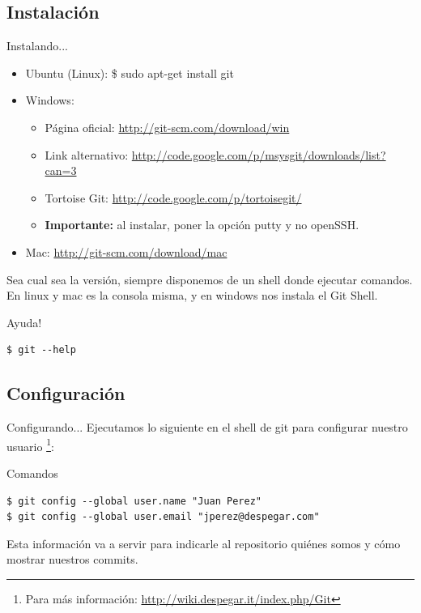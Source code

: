 \documentclass{beamer}
\begin{document}
\subsection{Instalación}
\begin{frame}[fragile]{Instalando...} 
  \begin{block}{}
      \begin{itemize}
      \item Ubuntu (Linux): \$ sudo apt-get install git \pause
	\item	 Windows: \begin{itemize}
			\item Página oficial: \url{http://git-scm.com/download/win} 
			\item Link alternativo: \url{http://code.google.com/p/msysgit/downloads/list?can=3}
			\item Tortoise Git: \url{http://code.google.com/p/tortoisegit/}
			\item \textbf{Importante:} al instalar, poner la opción putty y no openSSH.
		      \end{itemize} \pause
      \item Mac: \url{http://git-scm.com/download/mac} \pause
      \end{itemize}
  
    Sea cual sea la versión, siempre disponemos de un shell donde ejecutar comandos. En linux y mac es la consola misma,
    y en windows nos instala el Git Shell.
  \end{block}
  \pause
  \begin{block}{Ayuda!}
    \begin{verbatim}
$ git --help
     \end{verbatim}
  \end{block}
  
\end{frame}
\subsection{Configuración}
\begin{frame}[fragile]{Configurando...}
  Ejecutamos lo siguiente en el shell de git para configurar nuestro usuario \footnote{Para más información: \url{http://wiki.despegar.it/index.php/Git}}:
  
  \begin{block}{Comandos}
  \begin{verbatim}
$ git config --global user.name "Juan Perez"
$ git config --global user.email "jperez@despegar.com"
  \end{verbatim}
  \end{block}

  Esta información va a servir para indicarle al repositorio quiénes somos y cómo mostrar nuestros commits.
  
\end{frame}
\end{document}
